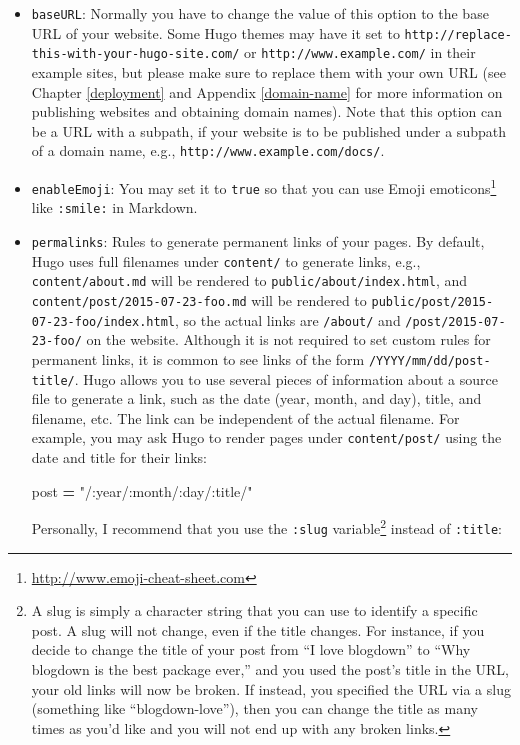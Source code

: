 \documentclass[12pt,]{krantz}
\makeatletter
\newenvironment{Shaded}{\begin{snugshade}}{\end{snugshade}}
\newcommand{\StringTok}[1]{\textcolor[rgb]{0.31,0.60,0.02}{#1}}
\newcommand{\OperatorTok}[1]{\textcolor[rgb]{0.81,0.36,0.00}{\textbf{#1}}}
\newcommand{\NormalTok}[1]{#1}
\renewcommand{\href}[2]{#2\footnote{\url{#1}}}
\newenvironment{kframe}{%
\medskip{}
\setlength{\fboxsep}{.8em}
 \def\at@end@of@kframe{}%
 \ifinner\ifhmode%
  \def\at@end@of@kframe{\end{minipage}}%
  \begin{minipage}{\columnwidth}%
 \fi\fi%
 \def\FrameCommand##1{\hskip\@totalleftmargin \hskip-\fboxsep
 \colorbox{shadecolor}{##1}\hskip-\fboxsep
     \hskip-\linewidth \hskip-\@totalleftmargin \hskip\columnwidth}%
 \MakeFramed {\advance\hsize-\width
   \@totalleftmargin\z@ \linewidth\hsize
   \@setminipage}}%
 {\par\unskip\endMakeFramed%
 \at@end@of@kframe}
\renewenvironment{Shaded}{\begin{kframe}}{\end{kframe}}
\theoremstyle{definition}
\theoremstyle{definition}
\theoremstyle{definition}
\theoremstyle{remark}
\makeatother
\begin{document}
\begin{itemize}
\item
  \texttt{baseURL}: Normally you have to change the value of this option
  to the base URL of your website. Some Hugo themes may
  have it set to \texttt{http://replace-this-with-your-hugo-site.com/}
  or \texttt{http://www.example.com/} in their example sites, but please
  make sure to replace them with your own URL (see Chapter
  \ref{deployment} and Appendix \ref{domain-name} for more information
  on publishing websites and obtaining domain names). Note that this
  option can be a URL with a subpath, if your website is to be published
  under a subpath of a domain name, e.g.,
  \texttt{http://www.example.com/docs/}.
\item
  \texttt{enableEmoji}: You may set it to \texttt{true} so
  that you can use \href{http://www.emoji-cheat-sheet.com}{Emoji
  emoticons} like \texttt{:smile:} in Markdown.
\item
  \texttt{permalinks}: Rules to generate permanent
  links of your pages. By default, Hugo uses full
  filenames under \texttt{content/} to generate links, e.g.,
  \texttt{content/about.md} will be rendered to
  \texttt{public/about/index.html}, and
  \texttt{content/post/2015-07-23-foo.md} will be rendered to
  \texttt{public/post/2015-07-23-foo/index.html}, so the actual links
  are \texttt{/about/} and \texttt{/post/2015-07-23-foo/} on the
  website. Although it is not required to set custom rules for permanent
  links, it is common to see links of the form
  \texttt{/YYYY/mm/dd/post-title/}. Hugo allows you to use several
  pieces of information about a source file to generate a link, such as
  the date (year, month, and day), title, and filename, etc. The link
  can be independent of the actual filename. For example, you may ask
  Hugo to render pages under \texttt{content/post/} using the date and
  title for their links:

\begin{Shaded}
\begin{Highlighting}[]
\NormalTok{[permalinks]}
\NormalTok{    post }\OperatorTok{=} \StringTok{"/:year/:month/:day/:title/"}
\end{Highlighting}
\end{Shaded}

  Personally, I recommend that you use the \texttt{:slug}
  variable\footnote{A slug is simply a character string that you can use
    to identify a specific post. A slug will not change, even if the
    title changes. For instance, if you decide to change the title of
    your post from ``I love blogdown'' to ``Why blogdown is the best
    package ever,'' and you used the post's title in the URL, your old
    links will now be broken. If instead, you specified the URL via a
    slug (something like ``blogdown-love''), then you can change the
    title as many times as you'd like and you will not end up with any
    broken links.} instead of \texttt{:title}:


\end{itemize}
\end{document}

